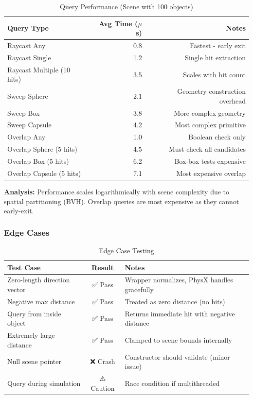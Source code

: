 \begin{table}[h]
\centering
\begin{tabular}{|l|r|r|}
\hline
\textbf{Query Type} & \textbf{Avg Time ($\mu$s)} & \textbf{Notes} \\
\hline
Raycast Any & 0.8 & Fastest - early exit \\
\hline
Raycast Single & 1.2 & Single hit extraction \\
\hline
Raycast Multiple (10 hits) & 3.5 & Scales with hit count \\
\hline
Sweep Sphere & 2.1 & Geometry construction overhead \\
\hline
Sweep Box & 3.8 & More complex geometry \\
\hline
Sweep Capsule & 4.2 & Most complex primitive \\
\hline
Overlap Any & 1.0 & Boolean check only \\
\hline
Overlap Sphere (5 hits) & 4.5 & Must check all candidates \\
\hline
Overlap Box (5 hits) & 6.2 & Box-box tests expensive \\
\hline
Overlap Capsule (5 hits) & 7.1 & Most expensive overlap \\
\hline
\end{tabular}
\caption{Query Performance (Scene with 100 objects)}
\end{table}

\textbf{Analysis:} Performance scales logarithmically with scene complexity due to spatial partitioning (BVH). Overlap queries are most expensive as they cannot early-exit.

\subsubsection{Edge Cases}

\begin{table}[h]
\centering
\begin{tabular}{|l|c|p{6cm}|}
\hline
\textbf{Test Case} & \textbf{Result} & \textbf{Notes} \\
\hline
Zero-length direction vector & ✅ Pass & Wrapper normalizes, PhysX handles gracefully \\
\hline
Negative max distance & ✅ Pass & Treated as zero distance (no hits) \\
\hline
Query from inside object & ✅ Pass & Returns immediate hit with negative distance \\
\hline
Extremely large distance & ✅ Pass & Clamped to scene bounds internally \\
\hline
Null scene pointer & ❌ Crash & Constructor should validate (minor issue) \\
\hline
Query during simulation & ⚠️ Caution & Race condition if multithreaded \\
\hline
\end{tabular}
\caption{Edge Case Testing}
\end{table}

